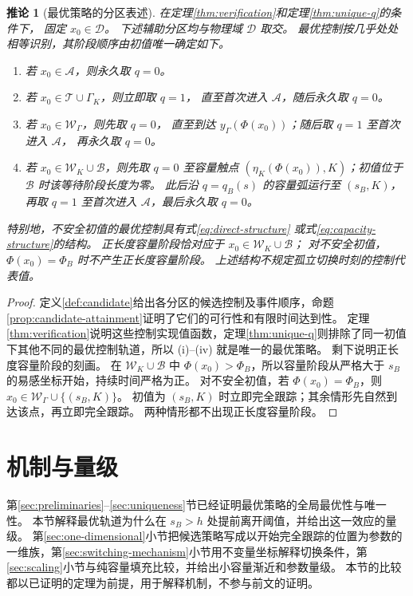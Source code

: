 \documentclass[11pt,a4paper,UTF8]{ctexart}
\newtheorem{corollary}[theorem]{推论}
\theoremstyle{definition}
\newcommand{\Acal}{\mathcal A}
\newcommand{\Dcal}{\mathcal D}
\begin{document}
\begin{corollary}[最优策略的分区表述]
\label{cor:optimal-synthesis}
在定理\ref{thm:verification}和定理\ref{thm:unique-q}的条件下，
固定 $x_0\in\Dcal$。
下述辅助分区均与物理域 $\Dcal$ 取交。
最优控制按几乎处处相等识别，其阶段顺序由初值唯一确定如下。
\begin{enumerate}[label=\textup{(\roman*)}]
\item 若 $x_0\in\Acal$，则永久取 $q=0$。
\item 若 $x_0\in\mathcal T\cup\Gamma_K$，则立即取 $q=1$，
直至首次进入 $\Acal$，随后永久取 $q=0$。
\item 若 $x_0\in\mathcal W_\Gamma$，则先取 $q=0$，
直至到达 $y_\Gamma(\Phi(x_0))$；随后取 $q=1$ 至首次进入 $\Acal$，
再永久取 $q=0$。
\item 若 $x_0\in\mathcal W_K\cup\mathcal B$，则先取 $q=0$ 至容量触点
$(\eta_K(\Phi(x_0)),K)$；初值位于 $\mathcal B$ 时该等待阶段长度为零。
此后沿 $q=q_B(s)$ 的容量弧运行至 $(s_B,K)$，
再取 $q=1$ 至首次进入 $\Acal$，最后永久取 $q=0$。
\end{enumerate}
特别地，不安全初值的最优控制具有式\eqref{eq:direct-structure}
或式\eqref{eq:capacity-structure}的结构。
正长度容量阶段恰对应于 $x_0\in\mathcal W_K\cup\mathcal B$；
对不安全初值，$\Phi(x_0)=\Phi_B$ 时不产生正长度容量阶段。
上述结构不规定孤立切换时刻的控制代表值。
\end{corollary}

\begin{proof}
定义\ref{def:candidate}给出各分区的候选控制及事件顺序，命题\ref{prop:candidate-attainment}证明了它们的可行性和有限时间达到性。
定理\ref{thm:verification}说明这些控制实现值函数，定理\ref{thm:unique-q}则排除了同一初值下其他不同的最优控制轨道，所以 (i)--(iv) 就是唯一的最优策略。
剩下说明正长度容量阶段的刻画。
在 $\mathcal W_K\cup\mathcal B$ 中 $\Phi(x_0)>\Phi_B$，所以容量阶段从严格大于 $s_B$ 的易感坐标开始，持续时间严格为正。
对不安全初值，若 $\Phi(x_0)=\Phi_B$，则 $x_0\in\mathcal W_\Gamma\cup\{(s_B,K)\}$。
初值为 $(s_B,K)$ 时立即完全跟踪；其余情形先自然到达该点，再立即完全跟踪。
两种情形都不出现正长度容量阶段。
\end{proof}

\section{机制与量级}
\label{sec:mechanisms}

第\ref{sec:preliminaries}--\ref{sec:uniqueness}节已经证明最优策略的全局最优性与唯一性。
本节解释最优轨道为什么在 $s_B>h$ 处提前离开阈值，并给出这一效应的量级。
第\ref{sec:one-dimensional}小节把候选策略写成以开始完全跟踪的位置为参数的一维族，第\ref{sec:switching-mechanism}小节用不变量坐标解释切换条件，第\ref{sec:scaling}小节与纯容量填充比较，并给出小容量渐近和参数量级。
本节的比较都以已证明的定理为前提，用于解释机制，不参与前文的证明。
\end{document}
